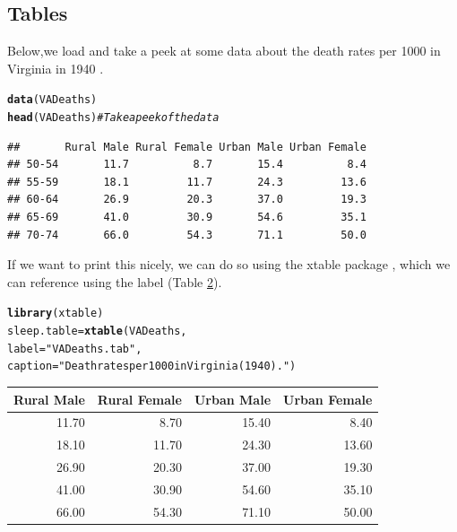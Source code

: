 \documentclass{article}\usepackage[]{graphicx}\usepackage[]{xcolor}
\makeatletter
\newcommand{\hlsng}[1]{\textcolor[rgb]{0.192,0.494,0.8}{#1}}%
\newcommand{\hlcom}[1]{\textcolor[rgb]{0.678,0.584,0.686}{\textit{#1}}}%
\newcommand{\hldef}[1]{\textcolor[rgb]{0.345,0.345,0.345}{#1}}%
\newcommand{\hlkwb}[1]{\textcolor[rgb]{0.69,0.353,0.396}{#1}}%
\newcommand{\hlkwc}[1]{\textcolor[rgb]{0.333,0.667,0.333}{#1}}%
\newcommand{\hlkwd}[1]{\textcolor[rgb]{0.737,0.353,0.396}{\textbf{#1}}}%
\newenvironment{kframe}{%
 \def\at@end@of@kframe{}%
 \ifinner\ifhmode%
  \def\at@end@of@kframe{\end{minipage}}%
  \begin{minipage}{\columnwidth}%
 \fi\fi%
 \def\FrameCommand##1{\hskip\@totalleftmargin \hskip-\fboxsep
 \colorbox{shadecolor}{##1}\hskip-\fboxsep
     \hskip-\linewidth \hskip-\@totalleftmargin \hskip\columnwidth}%
 \MakeFramed {\advance\hsize-\width
   \@totalleftmargin\z@ \linewidth\hsize
   \@setminipage}}%
 {\par\unskip\endMakeFramed%
 \at@end@of@kframe}
\newenvironment{knitrout}{}{} %
\makeatother
\begin{document}
\begin{multicols}{2}
\subsection{Tables}
Below,we load and take a peek at some data about the death rates per 1000 in Virginia in 1940 \citep{molyneaux1947differences}.
\begin{knitrout}\scriptsize
{}\color{fgcolor}\begin{kframe}
\begin{alltt}
\hlkwd{data}\hldef{(VADeaths)}
\hlkwd{head}\hldef{(VADeaths)} \hlcom{# Take a peek of the data}
\end{alltt}
\begin{verbatim}
##       Rural Male Rural Female Urban Male Urban Female
## 50-54       11.7          8.7       15.4          8.4
## 55-59       18.1         11.7       24.3         13.6
## 60-64       26.9         20.3       37.0         19.3
## 65-69       41.0         30.9       54.6         35.1
## 70-74       66.0         54.3       71.1         50.0
\end{verbatim}
\end{kframe}
\end{knitrout}
\indent If we want to print this nicely, we can do so using the xtable package \citep{xtable}, which we can reference using the label (Table \ref{VADeaths.tab}).
\begin{knitrout}\scriptsize
{}\color{fgcolor}\begin{kframe}
\begin{alltt}
\hlkwd{library}\hldef{(xtable)}
\hldef{sleep.table} \hlkwb{=} \hlkwd{xtable}\hldef{(VADeaths,}
                    \hlkwc{label} \hldef{=} \hlsng{"VADeaths.tab"}\hldef{,}
                    \hlkwc{caption} \hldef{=} \hlsng{"Death rates per 1000 in Virginia (1940)."}\hldef{)}
\end{alltt}
\end{kframe}
\end{knitrout}

\begin{table}[H]
 \begin{center}
\begin{table}[H]
\centering
\begingroup\small
\begin{tabular}{rrrr}
  \hline
Rural Male & Rural Female & Urban Male & Urban Female \\ 
  \hline
11.70 & 8.70 & 15.40 & 8.40 \\ 
  18.10 & 11.70 & 24.30 & 13.60 \\ 
  26.90 & 20.30 & 37.00 & 19.30 \\ 
  41.00 & 30.90 & 54.60 & 35.10 \\ 
  66.00 & 54.30 & 71.10 & 50.00 \\ 
   \hline
\end{tabular}
\endgroup
\label{VADeaths.tab}
\end{table}


\end{center}
\end{table}
\end{multicols}
\end{document}
